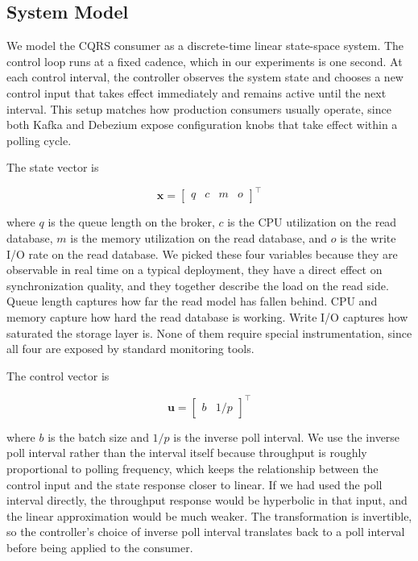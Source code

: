 \documentclass[10pt,a4paper]{article}
\begin{document}
\subsection{System Model}

We model the CQRS consumer as a discrete-time linear state-space system. The control loop runs at a fixed cadence, which in our experiments is one second. At each control interval, the controller observes the system state and chooses a new control input that takes effect immediately and remains active until the next interval. This setup matches how production consumers usually operate, since both Kafka and Debezium expose configuration knobs that take effect within a polling cycle.

The state vector is

\begin{equation}
\mathbf{x} = \begin{bmatrix} q & c & m & o \end{bmatrix}^\top
\end{equation}

where $q$ is the queue length on the broker, $c$ is the CPU utilization on the read database, $m$ is the memory utilization on the read database, and $o$ is the write I/O rate on the read database. We picked these four variables because they are observable in real time on a typical deployment, they have a direct effect on synchronization quality, and they together describe the load on the read side. Queue length captures how far the read model has fallen behind. CPU and memory capture how hard the read database is working. Write I/O captures how saturated the storage layer is. None of them require special instrumentation, since all four are exposed by standard monitoring tools.

The control vector is

\begin{equation}
\mathbf{u} = \begin{bmatrix} b & 1/p \end{bmatrix}^\top
\end{equation}

where $b$ is the batch size and $1/p$ is the inverse poll interval. We use the inverse poll interval rather than the interval itself because throughput is roughly proportional to polling frequency, which keeps the relationship between the control input and the state response closer to linear. If we had used the poll interval directly, the throughput response would be hyperbolic in that input, and the linear approximation would be much weaker. The transformation is invertible, so the controller's choice of inverse poll interval translates back to a poll interval before being applied to the consumer.
\end{document}
